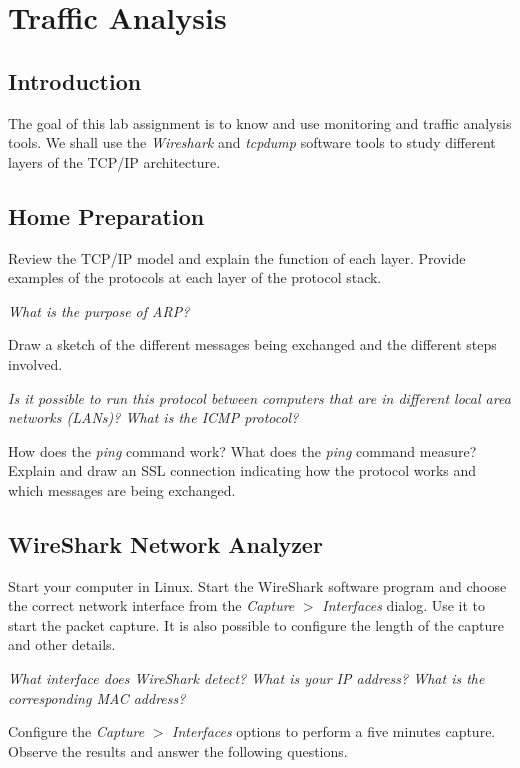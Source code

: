 \chapter{Traffic Analysis}

\section{Introduction}

The goal of this lab assignment is to know and use monitoring and traffic analysis tools. We shall use the \emph{Wireshark} and \emph{tcpdump} software tools to study different layers of the TCP/IP architecture.

\section{Home Preparation}

Review the TCP/IP model and explain the function of each layer. Provide examples of the protocols at each layer of the protocol stack.

\emph{What is the purpose of ARP?}

Draw a sketch of the different messages being exchanged and the different steps involved.

\emph{Is it possible to run this protocol between computers that are in different local area networks (LANs)? What is the ICMP protocol?}

How does the \emph{ping} command work?
What does the \emph{ping} command measure?
Explain and draw an SSL connection indicating how the protocol works and which messages are being exchanged.

\section{WireShark Network Analyzer}

Start your computer in Linux. Start the WireShark software program and choose the correct network interface from the \emph{Capture} $>$ \emph{Interfaces} dialog. Use it to start the packet capture. It is also possible to configure the length of the capture and other details.

\emph{What interface does WireShark detect? What is your IP address? What is the corresponding MAC address?}

Configure the \emph{Capture} $>$ \emph{Interfaces} options to perform a five minutes capture. Observe the results and answer the following questions.

